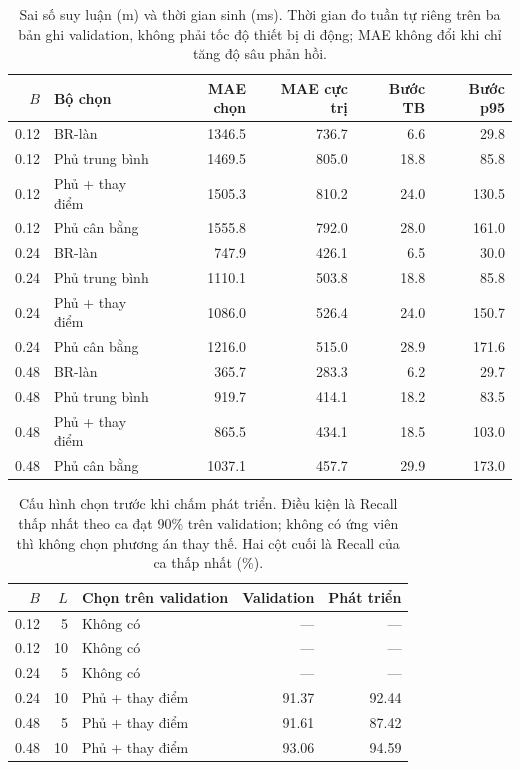 \begin{table}[htbp]
\centering\small
\setlength{\tabcolsep}{3pt}
\caption{Sai số suy luận (m) và thời gian sinh (ms). Thời gian đo tuần tự riêng trên ba bản ghi validation, không phải tốc độ thiết bị di động; MAE không đổi khi chỉ tăng độ sâu phản hồi.}\label{tab:coverage-frontier-timing}
\begin{tabular}{rlrrrr}
\toprule
$B$ & Bộ chọn & MAE chọn & MAE cực trị & Bước TB & Bước p95\\\midrule
0.12 & BR-làn & 1346.5 & 736.7 & 6.6 & 29.8\\
0.12 & Phủ trung bình & 1469.5 & 805.0 & 18.8 & 85.8\\
0.12 & Phủ + thay điểm & 1505.3 & 810.2 & 24.0 & 130.5\\
0.12 & Phủ cân bằng & 1555.8 & 792.0 & 28.0 & 161.0\\
0.24 & BR-làn & 747.9 & 426.1 & 6.5 & 30.0\\
0.24 & Phủ trung bình & 1110.1 & 503.8 & 18.8 & 85.8\\
0.24 & Phủ + thay điểm & 1086.0 & 526.4 & 24.0 & 150.7\\
0.24 & Phủ cân bằng & 1216.0 & 515.0 & 28.9 & 171.6\\
0.48 & BR-làn & 365.7 & 283.3 & 6.2 & 29.7\\
0.48 & Phủ trung bình & 919.7 & 414.1 & 18.2 & 83.5\\
0.48 & Phủ + thay điểm & 865.5 & 434.1 & 18.5 & 103.0\\
0.48 & Phủ cân bằng & 1037.1 & 457.7 & 29.9 & 173.0\\
\bottomrule
\end{tabular}
\end{table}

\begin{table}[htbp]
\centering\small
\setlength{\tabcolsep}{3pt}
\caption{Cấu hình chọn trước khi chấm phát triển. Điều kiện là Recall thấp nhất theo ca đạt 90\% trên validation; không có ứng viên thì không chọn phương án thay thế. Hai cột cuối là Recall của ca thấp nhất (\%).}\label{tab:coverage-frontier-selection}
\begin{tabular}{rrlrr}
\toprule
$B$ & $L$ & Chọn trên validation & Validation & Phát triển\\\midrule
0.12 & 5 & Không có & --- & ---\\
0.12 & 10 & Không có & --- & ---\\
0.24 & 5 & Không có & --- & ---\\
0.24 & 10 & Phủ + thay điểm & 91.37 & 92.44\\
0.48 & 5 & Phủ + thay điểm & 91.61 & 87.42\\
0.48 & 10 & Phủ + thay điểm & 93.06 & 94.59\\
\bottomrule
\end{tabular}
\end{table}
